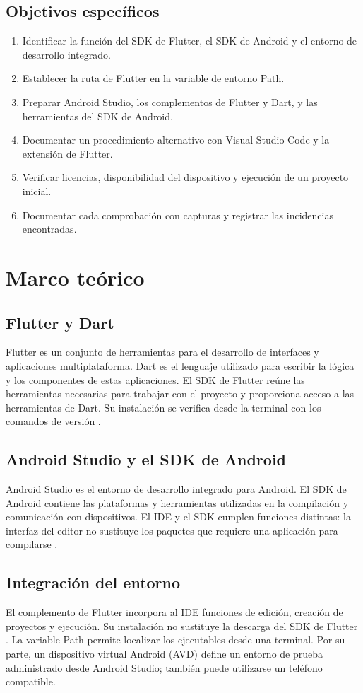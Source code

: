\documentclass[12pt,letterpaper]{article}
\begin{document}
\subsection{Objetivos específicos}
\begin{enumerate}[leftmargin=*]
\item Identificar la función del SDK de Flutter, el SDK de Android y el entorno de desarrollo integrado.
\item Establecer la ruta de Flutter en la variable de entorno Path.
\item Preparar Android Studio, los complementos de Flutter y Dart, y las herramientas del SDK de Android.
\item Documentar un procedimiento alternativo con Visual Studio Code y la extensión de Flutter.
\item Verificar licencias, disponibilidad del dispositivo y ejecución de un proyecto inicial.
\item Documentar cada comprobación con capturas y registrar las incidencias encontradas.
\end{enumerate}

\section{Marco teórico}
\subsection{Flutter y Dart}
Flutter es un conjunto de herramientas para el desarrollo de interfaces y aplicaciones multiplataforma. Dart es el lenguaje utilizado para escribir la lógica y los componentes de estas aplicaciones. El SDK de Flutter reúne las herramientas necesarias para trabajar con el proyecto y proporciona acceso a las herramientas de Dart. Su instalación se verifica desde la terminal con los comandos de versión \citep{fluttermanual}.

\subsection{Android Studio y el SDK de Android}
Android Studio es el entorno de desarrollo integrado para Android. El SDK de Android contiene las plataformas y herramientas utilizadas en la compilación y comunicación con dispositivos. El IDE y el SDK cumplen funciones distintas: la interfaz del editor no sustituye los paquetes que requiere una aplicación para compilarse \citep{androidinstall}.

\subsection{Integración del entorno}
El complemento de Flutter incorpora al IDE funciones de edición, creación de proyectos y ejecución. Su instalación no sustituye la descarga del SDK de Flutter \citep{flutteride,flutterandroid}. La variable Path permite localizar los ejecutables desde una terminal. Por su parte, un dispositivo virtual Android (AVD) define un entorno de prueba administrado desde Android Studio; también puede utilizarse un teléfono compatible.
\end{document}
